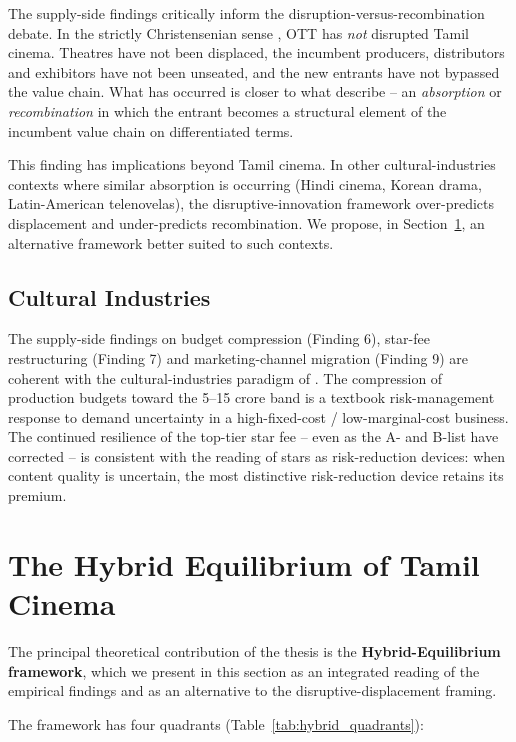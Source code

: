 The supply-side findings critically inform the
disruption-versus-recombination debate.  In the strictly
Christensenian sense \citep{christensen1997,christensen2015}, OTT has
\emph{not} disrupted Tamil cinema.  Theatres have not been displaced,
the incumbent producers, distributors and exhibitors have not been
unseated, and the new entrants have not bypassed the value chain.
What has occurred is closer to what \citet{lobato2019,curtin2014}
describe -- an \emph{absorption} or \emph{recombination} in which
the entrant becomes a structural element of the incumbent value
chain on differentiated terms.

This finding has implications beyond Tamil cinema.  In other
cultural-industries contexts where similar absorption is occurring
(Hindi cinema, Korean drama, Latin-American telenovelas), the
disruptive-innovation framework over-predicts displacement and
under-predicts recombination.  We propose, in
Section~\ref{sec:hybrid_eq}, an alternative framework better suited
to such contexts.

\subsection{Cultural Industries}

The supply-side findings on budget compression (Finding 6), star-fee
restructuring (Finding 7) and marketing-channel migration
(Finding 9) are coherent with the cultural-industries paradigm of
\citet{hesmondhalgh2019,caves2000}.  The compression of production
budgets toward the 5--15 crore band is a textbook risk-management
response to demand uncertainty in a high-fixed-cost / low-marginal-cost
business.  The continued resilience of the top-tier star fee --
even as the A- and B-list have corrected -- is consistent with the
\citet{caves2000} reading of stars as risk-reduction devices: when
content quality is uncertain, the most distinctive
risk-reduction device retains its premium.

\section{The Hybrid Equilibrium of Tamil Cinema}
\label{sec:hybrid_eq}

The principal theoretical contribution of the thesis is the
\textbf{Hybrid-Equilibrium framework}, which we present in this
section as an integrated reading of the empirical findings and as
an alternative to the disruptive-displacement framing.

The framework has four quadrants
(Table~\ref{tab:hybrid_quadrants}):

